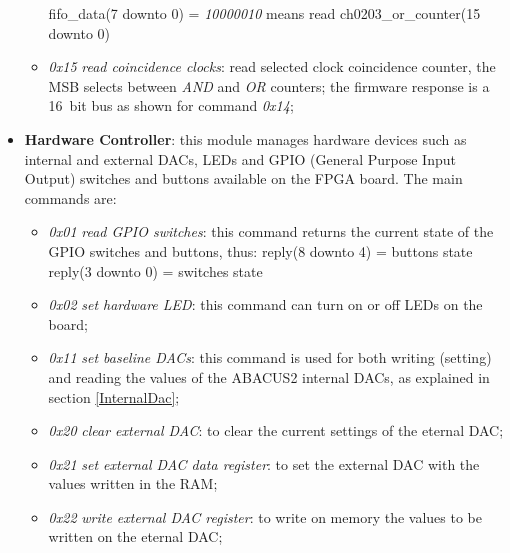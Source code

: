 \begin{itemize}
\begin{itemize}
		\newline
		fifo\_data(7 downto 0) = \textit{10000010} means read ch0203\_or\_counter(15 downto 0)
		\item \textit{0x15} \textit{read coincidence clocks}: read selected clock coincidence counter, the MSB selects between \textit{AND} and \textit{OR} counters; the firmware response is a 16~bit bus as shown for command \textit{0x14};
	\end{itemize}
	
	\item \textbf{Hardware Controller}: this module manages hardware devices such as internal and external DACs, LEDs and GPIO (General Purpose Input Output) switches and buttons available on the FPGA board. The main commands are:
	\begin{itemize}
		\item \textit{0x01} \textit{read GPIO switches}: this command returns the current state of the GPIO switches and buttons, thus:
		\newline
		reply(8 downto 4) = buttons state
		\newline
		reply(3 downto 0) = switches state
		\item \textit{0x02} \textit{set hardware LED}: this command can turn on or off LEDs on the board;
		\item \textit{0x11} \textit{set baseline DACs}: this command is used for both writing (setting) and reading the values of the ABACUS2 internal DACs, as explained in section \ref{InternalDac};
		\item \textit{0x20} \textit{clear external DAC}: to clear the current settings of the eternal DAC;
		\item \textit{0x21} \textit{set external DAC data register}: to set the external DAC with the values written in the RAM;
		\item \textit{0x22} \textit{write external DAC register}: to write on memory the values to be written on the eternal DAC;
	\end{itemize}  
		
\end{itemize}
